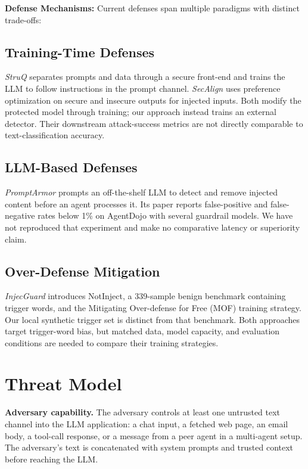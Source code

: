 \documentclass[11pt, a4paper]{article}
\begin{document}
\textbf{Defense Mechanisms:} Current defenses span multiple paradigms with distinct trade-offs:

\subsection{Training-Time Defenses}
\textit{StruQ} \citep{chen2024struq} separates prompts and data through a
secure front-end and trains the LLM to follow instructions in the prompt
channel. \textit{SecAlign} \citep{chen2024secalign} uses preference
optimization on secure and insecure outputs for injected inputs. Both
modify the protected model through training; our approach instead trains
an external detector. Their downstream attack-success metrics are not
directly comparable to text-classification accuracy.

\subsection{LLM-Based Defenses}
\textit{PromptArmor} \citep{si2025promptarmor} prompts an off-the-shelf LLM
to detect and remove injected content before an agent processes it. Its
paper reports false-positive and false-negative rates below 1\% on
AgentDojo with several guardrail models. We have not reproduced that
experiment and make no comparative latency or superiority claim.

\subsection{Over-Defense Mitigation}
\textit{InjecGuard} \citep{li2024injecguard} introduces NotInject, a
339-sample benign benchmark containing trigger words, and the Mitigating
Over-defense for Free (MOF) training strategy. Our local synthetic trigger
set is distinct from that benchmark. Both approaches target trigger-word
bias, but matched data, model capacity, and evaluation conditions are needed
to compare their training strategies.

\section{Threat Model}

\textbf{Adversary capability.} The adversary controls at least one
untrusted text channel into the LLM application: a chat input, a fetched
web page, an email body, a tool-call response, or a message from a
peer agent in a multi-agent setup. The adversary's text is concatenated
with system prompts and trusted context before reaching the LLM.
\end{document}
